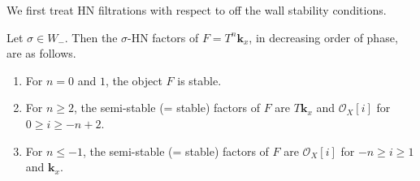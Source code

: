 \documentclass{amsart}
\begin{document}
We first treat HN filtrations with respect to off the wall stability conditions.
\begin{proposition}\label{prop:HNII}
  Let \(\sigma \in W_{-}\).
  Then the \(\sigma\)-HN factors of \(F = T^n \mathbf{k}_x\), in decreasing order of phase, are as follows.
  \begin{enumerate}
  \item For \(n = 0\) and \(1\), the object \(F\) is stable.
  \item For \(n \geq 2\), the semi-stable (= stable) factors of \(F\) are \(T \mathbf{k}_x\) and \(\mathcal{O}_X[i]\) for \(0 \geq i \geq -n+2\).
  \item For \(n \leq -1\), the semi-stable (= stable) factors of \(F\) are \(\mathcal{O}_X[i]\) for \(-n \geq i \geq 1\) and \(\mathbf{k}_x\).
  \end{enumerate}
\end{proposition}
\end{document}
